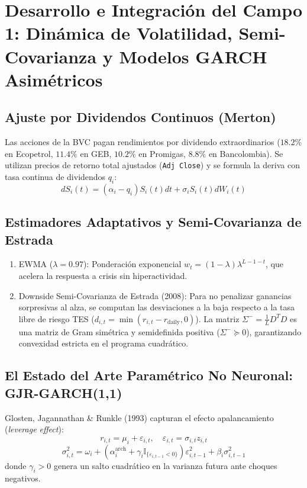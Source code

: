 \documentclass[11pt,a4paper]{article}
\begin{document}
\section{Desarrollo e Integración del Campo 1: Dinámica de Volatilidad, Semi-Covarianza y Modelos GARCH Asimétricos}

\subsection{Ajuste por Dividendos Continuos (Merton)}
Las acciones de la BVC pagan rendimientos por dividendo extraordinarios ($18.2\%$ en Ecopetrol, $11.4\%$ en GEB, $10.2\%$ en Promigas, $8.8\%$ en Bancolombia). Se utilizan precios de retorno total ajustados (\texttt{Adj Close}) y se formula la deriva con tasa continua de dividendos $q_i$:
\begin{equation}
    dS_i(t) = (\alpha_i - q_i) S_i(t) dt + \sigma_i S_i(t) dW_i(t)
\end{equation}

\subsection{Estimadores Adaptativos y Semi-Covarianza de Estrada}
\begin{enumerate}
    \item EWMA ($\lambda = 0.97$): Ponderación exponencial $w_t = (1-\lambda)\lambda^{L-1-t}$, que acelera la respuesta a crisis sin hiperactividad.
    \item Downside Semi-Covarianza de Estrada (2008): Para no penalizar ganancias sorpresivas al alza, se computan las desviaciones a la baja respecto a la tasa libre de riesgo TES ($d_{i,t} = \min(r_{i,t} - r_{\mathrm{daily}}, 0)$). La matriz $\Sigma^- = \frac{1}{L} D^T D$ es una matriz de Gram simétrica y semidefinida positiva ($\Sigma^- \succeq 0$), garantizando convexidad estricta en el programa cuadrático.
\end{enumerate}

\subsection{El Estado del Arte Paramétrico No Neuronal: GJR-GARCH(1,1)}
Glosten, Jagannathan \& Runkle (1993) capturan el efecto apalancamiento (\emph{leverage effect}):
\begin{equation}
    r_{i,t} = \mu_i + \varepsilon_{i,t}, \quad \varepsilon_{i,t} = \sigma_{i,t} z_{i,t}
\end{equation}
\begin{equation}
    \sigma_{i,t}^2 = \omega_i + \left(\alpha_i^{\mathrm{arch}} + \gamma_i \mathbb{I}_{\{\varepsilon_{i,t-1} < 0\}}\right) \varepsilon_{i,t-1}^2 + \beta_i \sigma_{i,t-1}^2
\end{equation}
donde $\gamma_i > 0$ genera un salto cuadrático en la varianza futura ante choques negativos.
\end{document}
